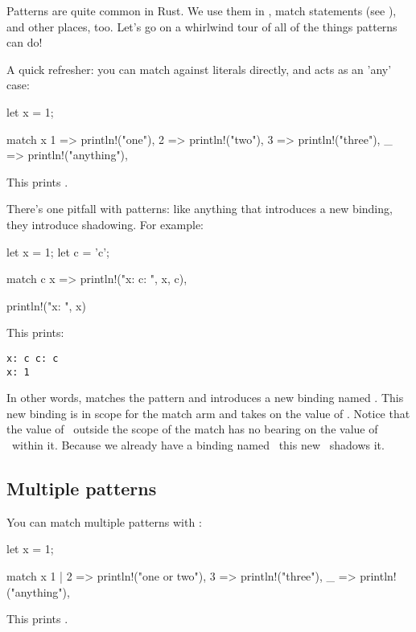 Patterns are quite common in Rust. We use them in , match statements (see ),
and other places, too. Let's go on a whirlwind tour of all of the things patterns can do!

\blank

A quick refresher: you can match against literals directly, and \code{\_} acts as an 'any' case:

\begin{rustc}
let x = 1;

match x {
    1 => println!("one"),
    2 => println!("two"),
    3 => println!("three"),
    _ => println!("anything"),
}
\end{rustc}

This prints .

There's one pitfall with patterns: like anything that introduces a new binding, they introduce shadowing. For example:

\begin{rustc}
let x = 1;
let c = 'c';

match c {
    x => println!("x: {} c: {}", x, c),
}

println!("x: {}", x)
\end{rustc}

This prints:

\begin{verbatim}
x: c c: c
x: 1
\end{verbatim}

In other words,  matches the pattern and introduces a new binding named \x. This new binding is in scope for the match arm 
and takes on the value of . Notice that the value of \x\ outside the scope of the match has no bearing on the value of \x\ 
within it. Because we already have a binding named \x\, this new \x\ shadows it.

\subsection*{Multiple patterns}

You can match multiple patterns with \code{|}:

\begin{rustc}
let x = 1;

match x {
    1 | 2 => println!("one or two"),
    3 => println!("three"),
    _ => println!("anything"),
}
\end{rustc}

This prints .

